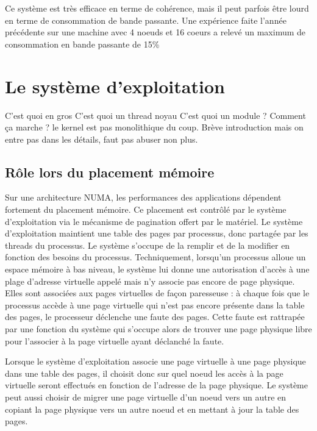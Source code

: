         Ce système est très efficace en terme de cohérence, mais il peut parfois
        être lourd en terme de consommation de bande passante. Une expérience
        faite l'année précédente sur une machine avec 4 noeuds et 16 coeurs a
        relevé un maximum de consommation en bande passante de
        15\%\cite{Lepers2014}

  \section{Le système d'exploitation}

    
    
    C'est quoi en gros C'est quoi un thread noyau C'est quoi un module ?
    Comment ça marche ? le kernel est pas monolithique du coup.  Brève
    introduction mais on entre pas dans les détails, faut pas abuser non plus.

    \subsection{Rôle lors du placement mémoire}

      Sur une architecture NUMA, les performances des applications dépendent
      fortement du placement mémoire. Ce placement est contrôlé par le système
      d'exploitation via le mécanisme de pagination offert par le matériel. Le
      système d'exploitation maintient une table des pages par processus, donc
      partagée par les threads du processus. Le système s'occupe de la remplir
      et de la modifier en fonction des besoins du processus. Techniquement,
      lorsqu'un processus alloue un espace mémoire à bas niveau, le système lui
      donne une autorisation d'accès à une plage d'adresse virtuelle appelé mais
      n'y associe pas encore de page physique. Elles sont associées aux pages
      virtuelles de façon paresseuse : à chaque fois que le processus accède à
      une page virtuelle qui n'est pas encore présente dans la table des pages,
      le processeur déclenche une faute des pages. Cette faute est rattrapée par
      une fonction du système qui s'occupe alors de trouver une page physique
      libre pour l'associer à la page virtuelle ayant déclanché la faute.
      
      Lorsque le système d'exploitation associe une page virtuelle à une page
      physique dans une table des pages, il choisit donc sur quel noeud les
      accès à la page virtuelle seront effectués en fonction de l'adresse de la
      page physique. Le système peut aussi choisir de migrer une page virtuelle
      d'un noeud vers un autre en copiant la page physique vers un autre noeud
      et en mettant à jour la table des pages.

